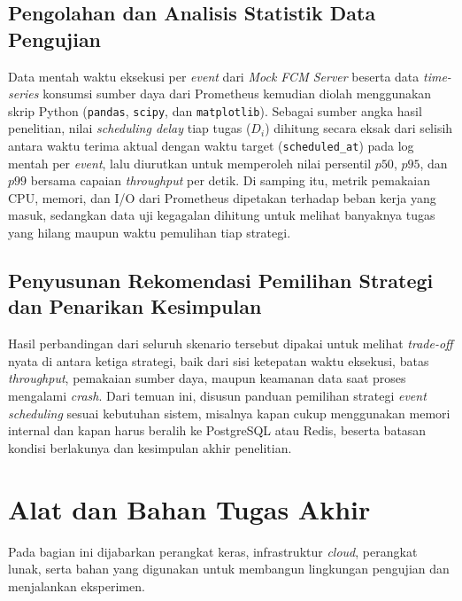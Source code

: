 \subsection{Pengolahan dan Analisis Statistik Data Pengujian} \label{III.Langkah 7}
Data mentah waktu eksekusi per \textit{event} dari \textit{Mock FCM Server} beserta data \textit{time-series} konsumsi sumber daya dari Prometheus kemudian diolah menggunakan skrip Python (\texttt{pandas}, \texttt{scipy}, dan \texttt{matplotlib}). Sebagai sumber angka hasil penelitian, nilai \textit{scheduling delay} tiap tugas ($D_i$) dihitung secara eksak dari selisih antara waktu terima aktual dengan waktu target (\texttt{scheduled\_at}) pada log mentah per \textit{event}, lalu diurutkan untuk memperoleh nilai persentil $p50$, $p95$, dan $p99$ bersama capaian \textit{throughput} per detik. Di samping itu, metrik pemakaian CPU, memori, dan I/O dari Prometheus dipetakan terhadap beban kerja yang masuk, sedangkan data uji kegagalan dihitung untuk melihat banyaknya tugas yang hilang maupun waktu pemulihan tiap strategi. \par

\subsection{Penyusunan Rekomendasi Pemilihan Strategi dan Penarikan Kesimpulan} \label{III.Langkah 8}
Hasil perbandingan dari seluruh skenario tersebut dipakai untuk melihat \textit{trade-off} nyata di antara ketiga strategi, baik dari sisi ketepatan waktu eksekusi, batas \textit{throughput}, pemakaian sumber daya, maupun keamanan data saat proses mengalami \textit{crash}. Dari temuan ini, disusun panduan pemilihan strategi \textit{event scheduling} sesuai kebutuhan sistem, misalnya kapan cukup menggunakan memori internal dan kapan harus beralih ke PostgreSQL atau Redis, beserta batasan kondisi berlakunya dan kesimpulan akhir penelitian. \par

\section{Alat dan Bahan Tugas Akhir} \label{III.Alat dan Bahan}
Pada bagian ini dijabarkan perangkat keras, infrastruktur \textit{cloud}, perangkat lunak, serta bahan yang digunakan untuk membangun lingkungan pengujian dan menjalankan eksperimen. \par

